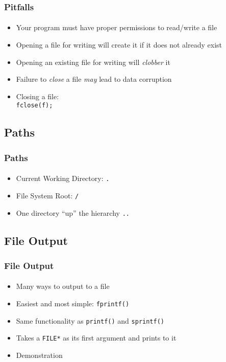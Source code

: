 \documentclass[]{beamer}
\begin{document}
\begin{frame}[fragile]
  \frametitle{Pitfalls}
  \framesubtitle{}

\begin{itemize}[<+->]
  \item Your program must have proper permissions to read/write a file
  \item Opening a file for writing will create it if it does not already exist
  \item Opening an existing file for writing will \emph{clobber} it
  \item Failure to \emph{close} a file \emph{may} lead to data corruption
  \item Closing a file:\\
  \texttt{fclose(f);}
\end{itemize}

\end{frame}

\subsection{Paths}

\begin{frame}[fragile]
  \frametitle{Paths}
  \framesubtitle{}

\begin{itemize}[<+->]
  \item Current Working Directory: \texttt{.}
  \item File System Root: \texttt{/}
  \item One directory ``up'' the hierarchy \texttt{..}
\end{itemize}

\end{frame}

\subsection{File Output}

\begin{frame}[fragile]
  \frametitle{File Output}
  \framesubtitle{}

\begin{itemize}[<+->]
  \item Many ways to output to a file
  \item Easiest and most simple: \texttt{fprintf()}
  \item Same functionality as \texttt{printf()} and \texttt{sprintf()}
  \item Takes a \texttt{FILE*} as its first argument and prints to it
  \item Demonstration
\end{itemize}

\end{frame}
\end{document}
